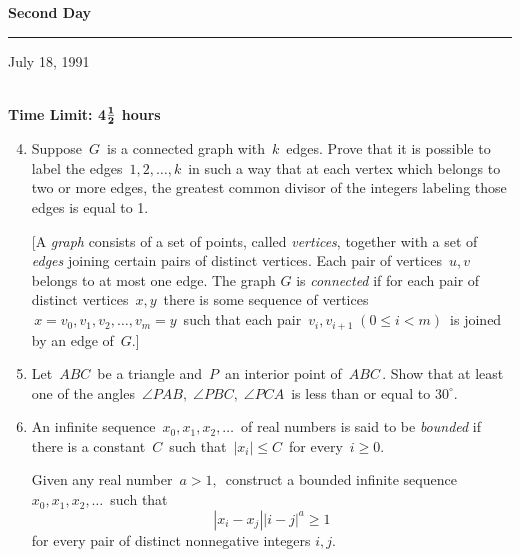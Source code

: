 \begin{center}
{\bf Second Day \rule[.05in]{.25in}{.01in} July 18, 1991} \\
{\bf Time Limit: 4}${{\bf 1}\over{\bf 2}}$ {\bf
hours}
\end{center}
\begin{enumerate}
\setcounter{enumi}{3}
\item
Suppose $\, G \,$ is a connected graph with $\, k \,$ edges. 
Prove that it
is
possible to label the edges $\, 1,2,\ldots, k \,$
 in such a way that at
each vertex which belongs to two or more edges, the greatest
common divisor of the integers labeling those edges is equal to
1. 

[A {\em graph\/} consists of a set of points, called {\em
vertices\/},
together with a set of {\em edges\/} joining certain pairs of
distinct vertices.  Each pair of vertices $\, u,v \,$ belongs to
at
most
one edge.  The graph $G$ is {\em connected\/} if for each pair of
distinct vertices $\, x,y \,$ there is some sequence of vertices
$\, x = v_0, v_1, v_2, \ldots, v_m = y \,$ such that each pair 
$\, v_i, v_{i+1} \; (0 \leq i < m)\,$ is joined by an edge of $\,
G$.]
\item
Let $\, ABC \,$ be a triangle and $\, P \,$ an interior point of
$\, ABC \,$.  Show
that at least one of the angles $\, \angle PAB, \; \angle PBC,
\; \angle PCA \,$ is less than or equal to $30^\circ$.
\item
An infinite sequence $\, x_0, x_1, x_2, \ldots \, $ of real
numbers is
said to be {\em bounded\/} if there is a constant $\, C \,$ such
that
$\, |x_i| \leq C \,$ for every $\, i \geq 0$.

Given any real number $\, a > 1, \,$ construct a bounded infinite
sequence
$x_0, x_1, x_2, \ldots \, $ such that
\[
|x_i - x_j| |i - j|^a \geq 1
\]
for every pair of distinct nonnegative integers $i,j$.
\end{enumerate}

